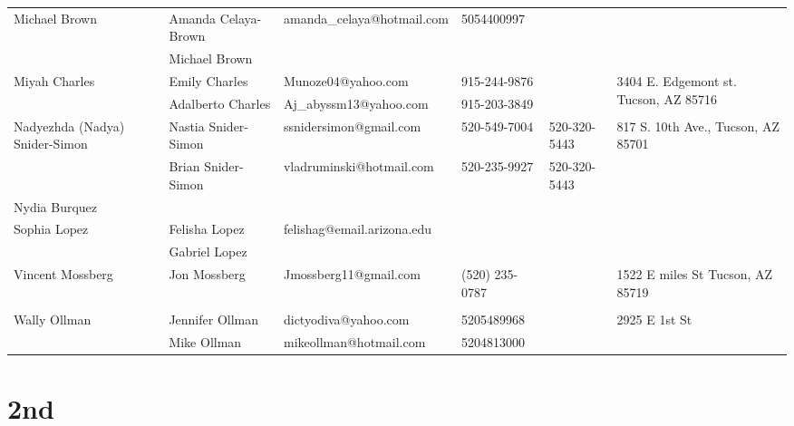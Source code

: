 \documentclass[landscape]{article}\usepackage[]{graphicx}\usepackage[]{color}
\begin{document}
\begin{longtable}{|p{100pt}|p{100pt}|p{140pt}|p{60pt}|p{64pt}|p{120pt}|}
 &  &  &  &  & \\
\hline
\multirow{2}{100pt}{Michael Brown} & Amanda Celaya-Brown & amanda\_celaya@hotmail.com & 5054400997 &  & \multirow{2}{120pt}{} \\
 & Michael Brown &  &  &  & \\
\hline
\multirow{2}{100pt}{Miyah Charles} & Emily Charles & Munoze04@yahoo.com & 915-244-9876 &  & \multirow{2}{120pt}{3404 E. Edgemont st. Tucson, AZ 85716} \\
 & Adalberto Charles & Aj\_abyssm13@yahoo.com & 915-203-3849 &  & \\
\hline
\multirow{2}{100pt}{Nadyezhda (Nadya) Snider-Simon} & Nastia Snider-Simon & ssnidersimon@gmail.com & 520-549-7004 & 520-320-5443 & \multirow{2}{120pt}{817 S. 10th Ave., Tucson, AZ 85701} \\
 & Brian Snider-Simon & vladruminski@hotmail.com & 520-235-9927 & 520-320-5443 & \\
\hline
\multirow{2}{100pt}{Nydia Burquez} &  &  &  &  & \multirow{2}{120pt}{} \\
 &  &  &  &  & \\
\hline
\multirow{2}{100pt}{Sophia Lopez} & Felisha Lopez & felishag@email.arizona.edu &  &  & \multirow{2}{120pt}{} \\
 & Gabriel Lopez &  &  &  & \\
\hline
\multirow{2}{100pt}{Vincent Mossberg} & Jon Mossberg & Jmossberg11@gmail.com & (520) 235-0787 &  & \multirow{2}{120pt}{1522 E miles St Tucson, AZ 85719} \\
 &  &  &  &  & \\
\hline
\multirow{2}{100pt}{Wally Ollman} & Jennifer Ollman & dictyodiva@yahoo.com & 5205489968 &  & \multirow{2}{120pt}{2925 E 1st St} \\
 & Mike Ollman & mikeollman@hotmail.com & 5204813000 &  & \\
\hline
\end{longtable}
\newpage
\section{2nd}
\end{document}
